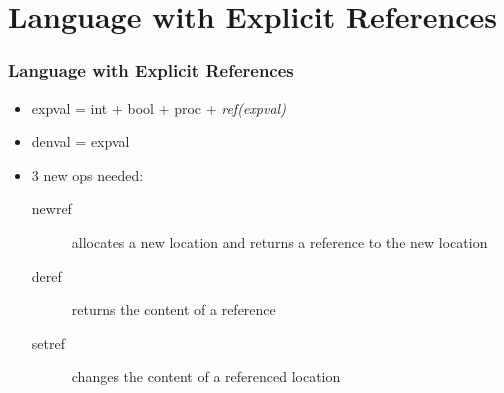 \documentclass{beamer}
\begin{document}
\section{Language with Explicit References}

\begin{frame}[fragile]
\frametitle{Language with Explicit References}
\begin{scriptsize}
\begin{itemize}
\item<1-> expval =  int + bool + proc + \emph{ref(expval)}

\item<1-> denval = expval

\item<2-> 3 new ops needed:
\begin{description}

\item[newref] allocates a new location and returns a reference to the new location

\item[deref] returns the content of a reference

\item[setref] changes the content of a referenced location

\end{description}


\end{itemize}
\end{scriptsize}
\end{frame}
\end{document}

